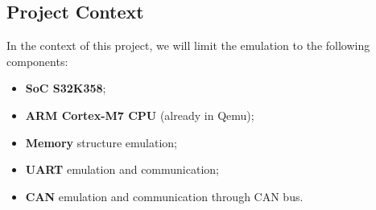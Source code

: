\subsection{Project Context}
In the context of this project, we will limit the emulation to the following components:
\begin{itemize}
    \item \textbf{SoC S32K358};
    \item \textbf{ARM Cortex-M7 CPU} (already in Qemu);
    \item \textbf{Memory} structure emulation;
    \item \textbf{UART} emulation and communication;
    \item \textbf{CAN} emulation and communication through CAN bus.
\end{itemize}
